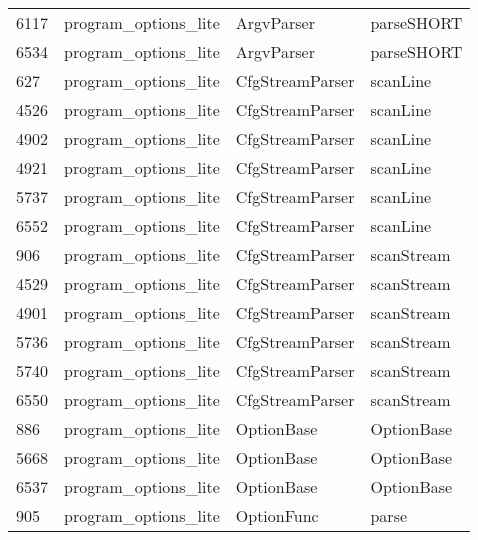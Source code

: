 \begin{tabular}{llll}
6117 &  program\_options\_lite &                 ArgvParser &                                parseSHORT \\
6534 &  program\_options\_lite &                 ArgvParser &                                parseSHORT \\
627  &  program\_options\_lite &            CfgStreamParser &                                  scanLine \\
4526 &  program\_options\_lite &            CfgStreamParser &                                  scanLine \\
4902 &  program\_options\_lite &            CfgStreamParser &                                  scanLine \\
4921 &  program\_options\_lite &            CfgStreamParser &                                  scanLine \\
5737 &  program\_options\_lite &            CfgStreamParser &                                  scanLine \\
6552 &  program\_options\_lite &            CfgStreamParser &                                  scanLine \\
906  &  program\_options\_lite &            CfgStreamParser &                                scanStream \\
4529 &  program\_options\_lite &            CfgStreamParser &                                scanStream \\
4901 &  program\_options\_lite &            CfgStreamParser &                                scanStream \\
5736 &  program\_options\_lite &            CfgStreamParser &                                scanStream \\
5740 &  program\_options\_lite &            CfgStreamParser &                                scanStream \\
6550 &  program\_options\_lite &            CfgStreamParser &                                scanStream \\
886  &  program\_options\_lite &                 OptionBase &                                OptionBase \\
5668 &  program\_options\_lite &                 OptionBase &                                OptionBase \\
6537 &  program\_options\_lite &                 OptionBase &                                OptionBase \\
905  &  program\_options\_lite &                 OptionFunc &                                     parse \\

\end{tabular}
